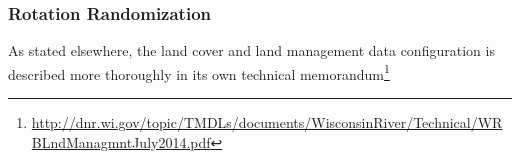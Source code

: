\subsubsection{Rotation Randomization}\label{sec:rotation_rando}

As stated elsewhere, the land cover and land management data configuration is described more thoroughly in its own technical memorandum\footnote{\url{http://dnr.wi.gov/topic/TMDLs/documents/WisconsinRiver/Technical/WRBLndManagmntJuly2014.pdf}}





